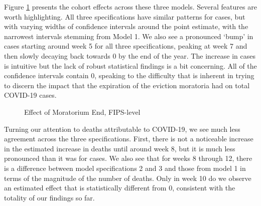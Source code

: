 \documentclass[12pt]{amsart}
\begin{document}
Figure \ref{fig:DR-DiD_sub} presents the cohort effects across these three models. Several features are worth highlighting. All three specifications have similar patterns for cases, but with varying widths of confidence intervals around the point estimate, with the narrowest intervals stemming from Model 1. We also see a pronounced `bump' in cases starting around week 5 for all three specifications, peaking at week 7 and then slowly decaying back towards 0 by the end of the year. The increase in cases is intuitive but the lack of robust statistical findings is a bit concerning. All of the confidence intervals contain 0, speaking to the difficulty that is inherent in trying to discern the impact that the expiration of the eviction moratoria had on total COVID-19 cases. 

\begin{figure}[h]
    \caption{Effect of Moratorium End, FIPS-level}
    \centering     %
{\footnotesize \justifying {} \par}
\label{fig:DR-DiD_sub}
\end{figure}

Turning our attention to deaths attributable to COVID-19, we see much less agreement across the three specifications. First, there is not a noticeable increase in the estimated increase in deaths until around week 8, but it is much less pronounced than it was for cases. We also see that for weeks 8 through 12, there is a difference between model specifications 2 and 3 and those from model 1 in terms of the magnitude of the number of deaths. Only in week 10 do we observe an estimated effect that is statistically different from 0, consistent with the totality of our findings so far. 
\end{document}

